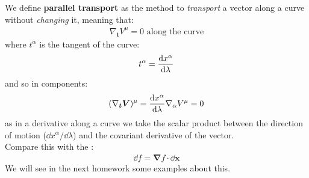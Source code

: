 \documentclass[../template.tex]{subfiles}
\begin{document}
We define \textbf{parallel transport} as the method to \textit{transport} a vector along a curve without \textit{changing} it, meaning that:
\begin{align*}
    \nabla_{\bm{t}} V^\mu = 0 \text{ along the curve} 
\end{align*}   
where $t^\alpha$ is the tangent of the curve:
\begin{align*}
    t^\alpha = \dv{x^\alpha}{\lambda}
\end{align*} 
and so in components:
\begin{align*}
    (\nabla_{\bm{t}} \bm{V})^\mu = \dv{x^\alpha}{\lambda} \nabla_\alpha V^\mu = 0
\end{align*}
as in a derivative along a curve we take the scalar product between the direction of motion ($\dd{x^\alpha}/{\dd{\lambda}}$) and the covariant derivative of the vector.\\

Compare this with the :
\begin{align*}
    \dd{f} = \bm{\nabla} f \cdot \dd{\bm{x}}
\end{align*}
We will see in the next homework some examples about this.
\end{document}
